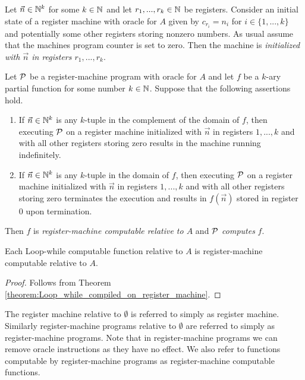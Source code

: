 \documentclass[10pt]{amsart}
\begin{document}
\begin{definition}
	Let $\vec{n}\in {\mathbb N}^k$ for some $k\in {\mathbb N}$ and let $r_1,...,r_k \in {\mathbb N}$ be registers. Consider an initial state of a register machine with oracle for $A$ given by $c_{r_i} = n_{i}$ for $i \in \{1,...,k\}$ and potentially some other registers storing nonzero numbers. As usual assume that the machines program counter is set to zero. Then the machine is \textit{initialized with $\vec{n}$ in registers $r_1,...,r_k$}.
\end{definition}

\begin{definition}
	Let ${\mathcal P}$ be a register-machine program with oracle for $A$ and let $f$ be a $k$-ary partial function for some number $k\in {\mathbb N}$. Suppose that the following assertions hold.
	\begin{enumerate}[label=\textbf{(\arabic*)}, leftmargin=3.0em]
		\item If $\vec{n}\in {\mathbb N}^k$ is any $k$-tuple in the complement of the domain of $f$, then executing ${\mathcal P}$ on a register machine initialized with $\vec{n}$ in registers $1,...,k$ and with all other registers storing zero results in the machine running indefinitely.
		\item If $\vec{n} \in {\mathbb N}^k$ is any $k$-tuple in the domain of $f$, then executing ${\mathcal P}$ on a register machine initialized with $\vec{n}$ in registers $1,...,k$ and with all other registers storing zero terminates the execution and results in $f(\vec{n})$ stored in register $0$ upon termination.
	\end{enumerate}
	Then $f$ is \textit{register-machine computable relative to $A$} and ${\mathcal P}$ \textit{computes} $f$.
\end{definition}

\begin{corollary}\label{corollary:Loop_while_computable_are_register_machine_computable}
	Each Loop-while computable function relative to $A$ is register-machine computable relative to $A$.
\end{corollary}
\begin{proof}
	Follows from Theorem \ref{theorem:Loop_while_compiled_on_register_machine}.
\end{proof}

\begin{remark}\label{remark:usual_register_machines_are_relative_to_empty_set}
	The register machine relative to $\emptyset$ is referred to simply as register machine. Similarly register-machine programs relative to $\emptyset$ are referred to simply as register-machine programs. Note that in register-machine programs we can remove oracle instructions as they have no effect. We also refer to functions computable by register-machine programs as register-machine computable functions.
\end{remark}
\end{document}
